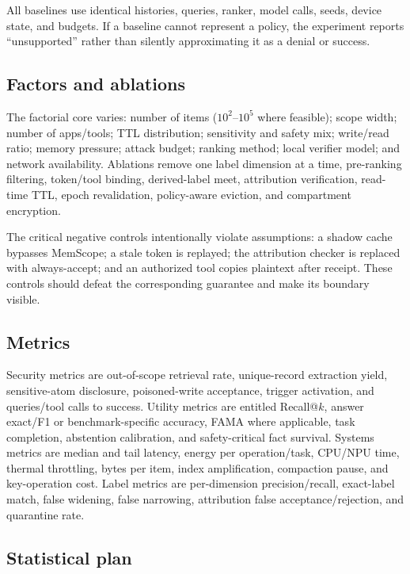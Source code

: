 All baselines use identical histories, queries, ranker, model calls, seeds, device state, and budgets. If a baseline cannot represent a policy, the experiment reports ``unsupported'' rather than silently approximating it as a denial or success.

\subsection{Factors and ablations}

The factorial core varies: number of items ($10^2$--$10^5$ where feasible); scope width; number of apps/tools; TTL distribution; sensitivity and safety mix; write/read ratio; memory pressure; attack budget; ranking method; local verifier model; and network availability. Ablations remove one label dimension at a time, pre-ranking filtering, token/tool binding, derived-label meet, attribution verification, read-time TTL, epoch revalidation, policy-aware eviction, and compartment encryption.

The critical negative controls intentionally violate assumptions: a shadow cache bypasses MemScope; a stale token is replayed; the attribution checker is replaced with always-accept; and an authorized tool copies plaintext after receipt. These controls should defeat the corresponding guarantee and make its boundary visible.

\subsection{Metrics}

Security metrics are out-of-scope retrieval rate, unique-record extraction yield, sensitive-atom disclosure, poisoned-write acceptance, trigger activation, and queries/tool calls to success. Utility metrics are entitled Recall@$k$, answer exact/F1 or benchmark-specific accuracy, FAMA where applicable, task completion, abstention calibration, and safety-critical fact survival. Systems metrics are median and tail latency, energy per operation/task, CPU/NPU time, thermal throttling, bytes per item, index amplification, compaction pause, and key-operation cost. Label metrics are per-dimension precision/recall, exact-label match, false widening, false narrowing, attribution false acceptance/rejection, and quarantine rate.

\subsection{Statistical plan}

